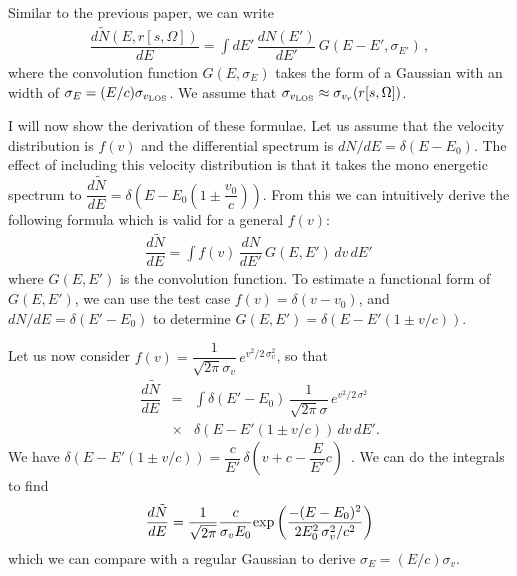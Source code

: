 \documentclass[aps,prl,10pt,twocolumn,superscriptaddress,showpacs]{revtex4-1}
\begin{document}
Similar to the previous paper, we can write
\begin{eqnarray}
\dfrac{d \tilde{N} (E, r[s, \Omega])}{dE} =\int dE' \, \dfrac{dN(E')}{dE'} \, G(E - E', \sigma_{E'}) \, ,
\label{eq:formula for modified dNdE}
\end{eqnarray}
where the convolution function $G(E, \sigma_E)$ takes the form of a Gaussian with an width of $\sigma_E = (E/c) \sigma_{v_{\rm LOS}}$.  We assume that $\sigma_{v_{\rm LOS}} \approx \sigma_{v_r}(r[s,\Omega])$.

I will now show the derivation of these formulae.  Let us assume that the velocity distribution is $f(v)$ and the differential spectrum is $dN/dE = \delta (E- E_0)$.  The effect of including this velocity distribution is that it takes the mono energetic spectrum to $\dfrac{d\tilde{N}}{dE} = \delta \left(E - E_0 (1 \pm \dfrac{v_0}{c})\right)$.  From this we can intuitively derive the following formula which is valid for a general $f(v)$:
\begin{eqnarray}
\dfrac{d\tilde{N}}{dE} = \int f(v) \, \dfrac{dN}{dE'} \, G(E, E') \, dv \, dE' \,
\label{eq:step 1}
\end{eqnarray}
where $G(E, E')$ is the convolution function.  To estimate a functional form of $G(E, E')$, we can use the test case $f(v) = \delta (v - v_0)$, and $dN/dE = \delta (E' - E_0)$ to determine $G(E, E') = \delta (E - E' (1 \pm v/c))$.

Let us now consider $f(v) = \dfrac{1}{\sqrt{2\pi} \sigma_v} \, e^{v^2/2 \, \sigma_v^2}$, so that
\begin{eqnarray}
\dfrac{d\tilde{N}}{dE} &=& \int \delta(E' - E_0) \, \dfrac{1}{\sqrt{2\pi} \sigma} \, e^{v^2/2 \, \sigma^2} \, \nonumber\\
&\times& \delta (E - E' (1 \pm v/c)) \, dv \, dE'.
\label{eq:step2}
\end{eqnarray}
We have $\delta (E - E' (1 \pm v/c)) = \dfrac{c}{E'} \, \delta \left(v + c - \dfrac{E}{E'} c \right)$\, .  We can do the integrals to find
\begin{eqnarray}
\dfrac{d\tilde{N}}{dE} =  \dfrac{1}{\sqrt{2\pi}} \dfrac{c}{\sigma_v E_0} {\rm exp} \left( \dfrac{-(E-E_0)^2}{2 E_0^2 \, \sigma_v^2/c^2} \right)
\label{eq:step3}
\end{eqnarray}
which we can compare with a regular Gaussian to derive $\sigma_E = (E/c) \sigma_v$.
\end{document}
